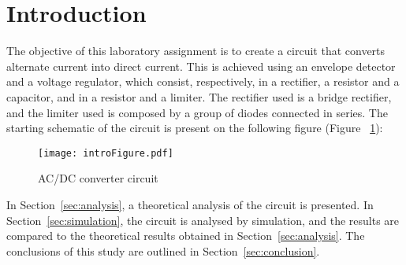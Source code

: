 \section{Introduction}
\label{sec:introduction}


\indent

The objective of this laboratory assignment is to create a circuit that converts alternate current into direct current. This is achieved using an envelope detector and a voltage regulator, which consist, respectively, in a rectifier, a resistor and a capacitor, and in a resistor and a limiter. The rectifier used is a bridge rectifier, and the limiter used is composed by a group of diodes connected in series.
The starting schematic of the circuit is present on the following figure (Figure ~\ref{fig:schematic}):


\begin{figure}[h!]
    \centering
    \texttt{[image: introFigure.pdf]}
    \caption{AC/DC converter circuit}
    \label{fig:schematic}
\end{figure}




In Section~\ref{sec:analysis}, a theoretical analysis of the circuit is
presented. In Section~\ref{sec:simulation}, the circuit is analysed by
simulation, and the results are compared to the theoretical results obtained in Section~\ref{sec:analysis}. The conclusions of this study are outlined in Section~\ref{sec:conclusion}.

